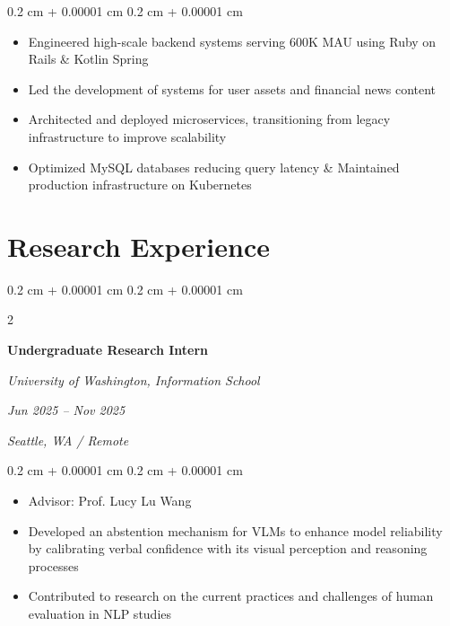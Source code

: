 \documentclass[10pt, letterpaper]{article}
\newenvironment{highlights}{
    \begin{itemize}[
        topsep=0.10 cm,
        parsep=0.10 cm,
        partopsep=0pt,
        itemsep=0pt,
        leftmargin=0.4 cm + 10pt
    ]
}{
    \end{itemize}
} %
\newenvironment{onecolentry}{
    \begin{adjustwidth}{
        0.2 cm + 0.00001 cm
    }{
        0.2 cm + 0.00001 cm
    }
}{
    \end{adjustwidth}
} %
\newenvironment{twocolentry}[2][]{
    \onecolentry
    \def\secondColumn{#2}
    \setcolumnwidth{\fill, 4.5 cm}
    \begin{paracol}{2}
}{
    \switchcolumn \raggedleft \secondColumn
    \end{paracol}
    \endonecolentry
} %
\begin{document}
        \vspace{0.10 cm}
        \begin{onecolentry}
            \begin{highlights}
                \item Engineered high-scale backend systems serving 600K MAU using Ruby on Rails \& Kotlin Spring
                \item Led the development of systems for user assets and financial news content
                \item Architected and deployed microservices, transitioning from legacy infrastructure to improve scalability
                \item Optimized MySQL databases reducing query latency \& Maintained production infrastructure on Kubernetes
            \end{highlights}
        \end{onecolentry}


    \section{Research Experience}

        \begin{twocolentry}{
        \textit{Jun 2025 – Nov 2025}
        
        \textit{Seattle, WA / Remote}}
            \textbf{Undergraduate Research Intern}

            \textit{University of Washington, Information School}
        \end{twocolentry}

        \vspace{0.10 cm}
        \begin{onecolentry}
            \begin{highlights}
                \item Advisor: Prof. Lucy Lu Wang
                \item Developed an abstention mechanism for VLMs to enhance model reliability by calibrating verbal confidence with its visual perception and reasoning processes
                \item Contributed to research on the current practices and challenges of human evaluation in NLP studies
            \end{highlights}
        \end{onecolentry}

        \vspace{0.4 cm}
\end{document}
